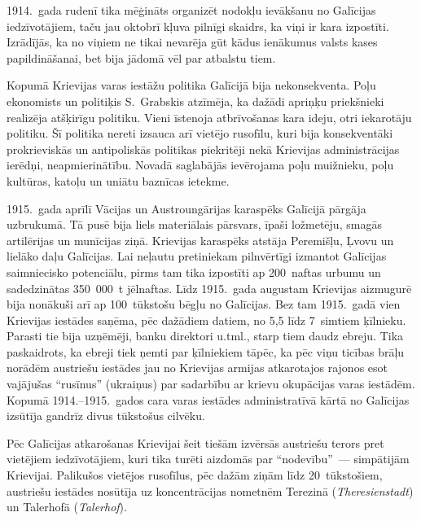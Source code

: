 \documentclass[twoside,a5paper,12pt,fleqn,openany]{extbook}
\newcommand{\detxti}[1]{\textit{\textgerman{#1}}}
\begin{document}
1914.~gada rudenī tika mēģināts organizēt nodokļu ievākšanu no Galīcijas iedzīvotājiem, taču jau oktobrī kļuva pilnīgi skaidrs, ka viņi ir kara izpostīti. Izrādījās, ka no viņiem ne tikai nevarēja gūt kādus ienākumus valsts kases papildināšanai, bet bija jādomā vēl par atbalstu tiem.

Kopumā Krievijas varas iestāžu politika Galīcijā bija nekonsekventa. Poļu ekonomists un politiķis S.~Grabskis atzīmēja, ka dažādi apriņķu priekšnieki realizēja atšķirīgu politiku. Vieni īstenoja atbrīvošanas kara ideju, otri iekarotāju politiku. Šī politika nereti izsauca arī vietējo rusofīlu, kuri bija konsekventāki prokrieviskās un antipoliskās politikas piekritēji nekā Krievijas administrācijas ierēdņi, neapmierinātību. Novadā saglabājās ievērojama poļu muižnieku, poļu kultūras, katoļu un uniātu baznīcas ietekme.

1915.~gada aprīlī Vācijas un Austroungārijas karaspēks Galīcijā pārgāja uzbrukumā. Tā pusē bija liels materiālais pārsvars, īpaši ložmetēju, smagās artilērijas un munīcijas ziņā. Krievijas karaspēks atstāja Peremišļu, Ļvovu un lielāko daļu Galīcijas. Lai neļautu pretiniekam pilnvērtīgi izmantot Galīcijas saimniecisko potenciālu, pirms tam tika izpostīti ap 200~naftas urbumu un sadedzinātas 350~000~t jēlnaftas. Līdz 1915.~gada augustam Krievijas aizmugurē bija nonākuši arī ap 100~tūkstošu bēgļu no Galīcijas. Bez tam 1915.~gadā vien Krievijas iestādes saņēma, pēc dažādiem datiem, no 5,5 līdz 7~simtiem ķīlnieku. Parasti tie bija uzņēmēji, banku direktori u.tml., starp tiem daudz ebreju. Tika paskaidrots, ka ebreji tiek ņemti par ķīlniekiem tāpēc, ka pēc viņu ticības brāļu norādēm austriešu iestādes jau no Krievijas armijas atkarotajos rajonos esot vajājušas ``rusīnus'' (ukraiņus) par sadarbību ar krievu okupācijas varas iestādēm. Kopumā 1914.--1915.~gados cara varas iestādes administratīvā kārtā no Galīcijas izsūtīja gandrīz divus tūkstošus cilvēku.

Pēc Galīcijas atkarošanas Krievijai šeit tiešām izvērsās austriešu terors pret vietējiem iedzīvotājiem, kuri tika turēti aizdomās par ``nodevību''~--- simpātijām Krievijai. Palikušos vietējos rusofīlus, pēc dažām ziņām līdz 20~tūkstošiem, austriešu iestādes nosūtīja uz koncentrācijas nometnēm Terezinā (\detxti{Theresienstadt}) un Talerhofā (\detxti{Talerhof}).
\end{document}
